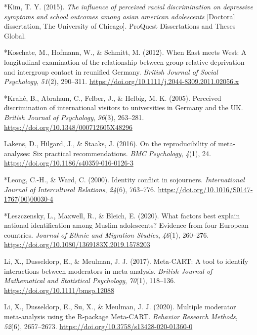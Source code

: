 \documentclass[12pt, letterpaper]{article}
\begin{document}
\leavevmode\hypertarget{ref-830}{}%
*Kim, T. Y. (2015). \emph{The influence of perceived racial
discrimination on depressive symptoms and school outcomes among asian
american adolescents} {[}Doctoral dissertation, The University of
Chicago{]}. ProQuest Dissertations and Theses Global.

\leavevmode\hypertarget{ref-401}{}%
*Koschate, M., Hofmann, W., \& Schmitt, M. (2012). When East meets West:
A longitudinal examination of the relationship between group relative
deprivation and intergroup contact in reunified Germany. \emph{British
Journal of Social Psychology}, \emph{51}(2), 290--311.
\url{https://doi.org/10.1111/j.2044-8309.2011.02056.x}

\leavevmode\hypertarget{ref-45}{}%
*Krahé, B., Abraham, C., Felber, J., \& Helbig, M. K. (2005). Perceived
discrimination of international visitors to universities in Germany and
the UK. \emph{British Journal of Psychology}, \emph{96}(3), 263--281.
\url{https://doi.org/10.1348/000712605X48296}

\leavevmode\hypertarget{ref-lakens_reproducibility_2016}{}%
Lakens, D., Hilgard, J., \& Staaks, J. (2016). On the reproducibility of
meta-analyses: Six practical recommendations. \emph{BMC Psychology},
\emph{4}(1), 24. \url{https://doi.org/10.1186/s40359-016-0126-3}

\leavevmode\hypertarget{ref-1993}{}%
*Leong, C.-H., \& Ward, C. (2000). Identity conflict in sojourners.
\emph{International Journal of Intercultural Relations}, \emph{24}(6),
763--776. \url{https://doi.org/10.1016/S0147-1767(00)00030-4}

\leavevmode\hypertarget{ref-3134}{}%
*Leszczensky, L., Maxwell, R., \& Bleich, E. (2020). What factors best
explain national identification among Muslim adolescents? Evidence from
four European countries. \emph{Journal of Ethnic and Migration Studies},
\emph{46}(1), 260--276.
\url{https://doi.org/10.1080/1369183X.2019.1578203}

\leavevmode\hypertarget{ref-li_meta-cart_2017}{}%
Li, X., Dusseldorp, E., \& Meulman, J. J. (2017). Meta-CART: A tool to
identify interactions between moderators in meta-analysis. \emph{British
Journal of Mathematical and Statistical Psychology}, \emph{70}(1),
118--136. \url{https://doi.org/10.1111/bmsp.12088}

\leavevmode\hypertarget{ref-li_multiple_2020}{}%
Li, X., Dusseldorp, E., Su, X., \& Meulman, J. J. (2020). Multiple
moderator meta-analysis using the R-package Meta-CART. \emph{Behavior
Research Methods}, \emph{52}(6), 2657--2673.
\url{https://doi.org/10.3758/s13428-020-01360-0}
\end{document}
